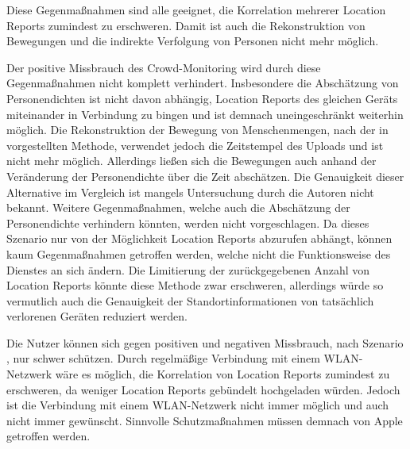 Diese Gegenmaßnahmen sind alle geeignet, die Korrelation mehrerer Location Reports zumindest zu erschweren.
Damit ist auch die Rekonstruktion von Bewegungen und die indirekte Verfolgung von Personen nicht mehr möglich. 

Der positive Missbrauch des Crowd-Monitoring wird durch diese Gegenmaßnahmen nicht komplett verhindert.
Insbesondere die Abschätzung von Personendichten ist nicht davon abhängig, Location Reports des gleichen Geräts miteinander in Verbindung zu bingen und ist demnach uneingeschränkt weiterhin möglich.
Die Rekonstruktion der Bewegung von Menschenmengen, nach der in \cite{Tonetto_FindMy} vorgestellten Methode, verwendet jedoch die Zeitstempel des Uploads und ist nicht mehr möglich.
Allerdings ließen sich die Bewegungen auch anhand der Veränderung der Personendichte über die Zeit abschätzen.
Die Genauigkeit dieser Alternative im Vergleich ist mangels Untersuchung durch die Autoren nicht bekannt.
Weitere Gegenmaßnahmen, welche auch die Abschätzung der Personendichte verhindern könnten, werden nicht vorgeschlagen.
Da dieses Szenario nur von der Möglichkeit Location Reports abzurufen abhängt, können kaum Gegenmaßnahmen getroffen werden, welche nicht die Funktionsweise des Dienstes an sich ändern.
Die Limitierung der zurückgegebenen Anzahl von Location Reports könnte diese Methode zwar erschweren, allerdings würde so vermutlich auch die Genauigkeit der Standortinformationen von tatsächlich verlorenen Geräten reduziert werden.

Die Nutzer können sich gegen positiven und negativen Missbrauch, nach Szenario , nur schwer schützen.
Durch regelmäßige Verbindung mit einem WLAN-Netzwerk wäre es möglich, die Korrelation von Location Reports zumindest zu erschweren, da weniger Location Reports gebündelt hochgeladen würden. 
Jedoch ist die Verbindung mit einem WLAN-Netzwerk nicht immer möglich und auch nicht immer gewünscht.
Sinnvolle Schutzmaßnahmen müssen demnach von Apple getroffen werden.



